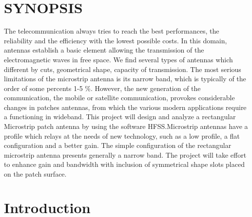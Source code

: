 \documentclass[12pt]{article}
\begin{document}
\tableofcontents
\thispagestyle{empty}
\cleardoublepage
\listoffigures
\thispagestyle{empty}
\cleardoublepage
\listoftables
\thispagestyle{empty}
\cleardoublepage


\section*{SYNOPSIS}
	\justify
	The telecommunication always tries to reach the best performances, the reliability and the efficiency with the lowest possible costs. In this domain, antennas establish a basic element allowing the transmission of the electromagnetic waves in free space. We find several types of antennas which different by cuts, geometrical shape, capacity of transmission. The most serious limitations of the microstrip antenna is its narrow band, which is typically of the order of some percents 1-5 \%. However, the new generation of the communication, the mobile or satellite communication, provokes considerable changes in patches antennas, from which the various modern applications require a functioning in wideband.
	This  project will design and analyze a rectangular Microstrip patch antenna by using the software HFSS.Microstrip antennas have a profile which relays at the needs of new technology, such as a low profile, a flat configuration and a better gain. The simple configuration of the rectangular microstrip antenna presents generally a narrow band. The project will take effort to enhance gain and bandwidth with inclusion of symmetrical shape slots placed on the patch surface.
\thispagestyle{empty}
\cleardoublepage





\setcounter{page}{1}
\section{Introduction}\label{sec:Introduction}
\end{document}
